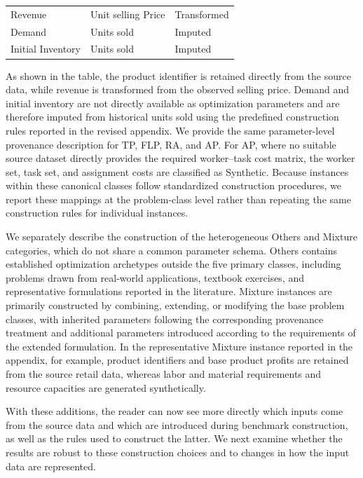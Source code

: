 \documentclass[11pt]{article}
\begin{document}
\begin{enumerate}[label=(AssoE.\arabic*),leftmargin=*]
\begin{enumerate}[label=(R1.Major.\arabic*),leftmargin=*]
\begin{center}
\begin{tabular}{lll}
Revenue
& Unit selling Price
& Transformed \\

Demand
& Units sold
& Imputed \\

Initial Inventory
& Units sold
& Imputed \\
\hline
\end{tabular}
\end{center}

As shown in the table, the product identifier is retained directly from the
source data, while revenue is transformed from the observed selling price.
Demand and initial inventory are not directly available as optimization
parameters and are therefore imputed from historical units sold using the
predefined construction rules reported in the revised appendix. We provide
the same parameter-level provenance description for TP, FLP, RA, and AP.
For AP, where no suitable source dataset directly provides the required
worker--task cost matrix, the worker set, task set, and assignment costs are
classified as Synthetic. Because instances within these canonical classes
follow standardized construction procedures, we report these mappings at the
problem-class level rather than repeating the same construction rules for
individual instances.

We separately describe the construction of the heterogeneous Others and
Mixture categories, which do not share a common parameter schema. Others
contains established optimization archetypes outside the five primary
classes, including problems drawn from real-world applications, textbook
exercises, and representative formulations reported in the literature.
Mixture instances are primarily constructed by combining, extending, or
modifying the base problem classes, with inherited parameters following the
corresponding provenance treatment and additional parameters introduced
according to the requirements of the extended formulation. In the
representative Mixture instance reported in the appendix, for example,
product identifiers and base product profits are retained from the source
retail data, whereas labor and material requirements and resource capacities
are generated synthetically.

With these additions, the reader can now see more directly which inputs come
from the source data and which are introduced during benchmark construction,
as well as the rules used to construct the latter. We next examine whether
the results are robust to these construction choices and to changes in how
the input data are represented.


\end{enumerate}
\end{enumerate}
\end{document}
